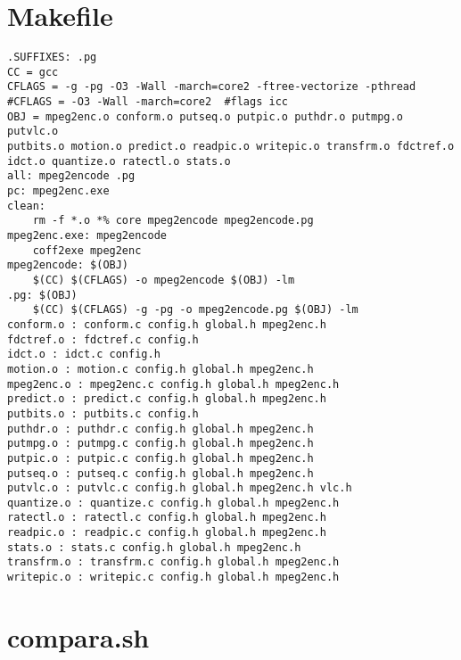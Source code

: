 \appendix
\chapter{Makefile}
\begin{lstlisting}
.SUFFIXES: .pg
CC = gcc
CFLAGS = -g -pg -O3 -Wall -march=core2 -ftree-vectorize -pthread
#CFLAGS = -O3 -Wall -march=core2  #flags icc
OBJ = mpeg2enc.o conform.o putseq.o putpic.o puthdr.o putmpg.o putvlc.o 
putbits.o motion.o predict.o readpic.o writepic.o transfrm.o fdctref.o 
idct.o quantize.o ratectl.o stats.o
all: mpeg2encode .pg
pc: mpeg2enc.exe
clean:
	rm -f *.o *% core mpeg2encode mpeg2encode.pg
mpeg2enc.exe: mpeg2encode
	coff2exe mpeg2enc
mpeg2encode: $(OBJ)
	$(CC) $(CFLAGS) -o mpeg2encode $(OBJ) -lm
.pg: $(OBJ)
	$(CC) $(CFLAGS) -g -pg -o mpeg2encode.pg $(OBJ) -lm
conform.o : conform.c config.h global.h mpeg2enc.h 
fdctref.o : fdctref.c config.h 
idct.o : idct.c config.h 
motion.o : motion.c config.h global.h mpeg2enc.h 
mpeg2enc.o : mpeg2enc.c config.h global.h mpeg2enc.h 
predict.o : predict.c config.h global.h mpeg2enc.h 
putbits.o : putbits.c config.h 
puthdr.o : puthdr.c config.h global.h mpeg2enc.h 
putmpg.o : putmpg.c config.h global.h mpeg2enc.h 
putpic.o : putpic.c config.h global.h mpeg2enc.h 
putseq.o : putseq.c config.h global.h mpeg2enc.h 
putvlc.o : putvlc.c config.h global.h mpeg2enc.h vlc.h 
quantize.o : quantize.c config.h global.h mpeg2enc.h 
ratectl.o : ratectl.c config.h global.h mpeg2enc.h 
readpic.o : readpic.c config.h global.h mpeg2enc.h 
stats.o : stats.c config.h global.h mpeg2enc.h 
transfrm.o : transfrm.c config.h global.h mpeg2enc.h 
writepic.o : writepic.c config.h global.h mpeg2enc.h 
\end{lstlisting}

\chapter{compara.sh}
